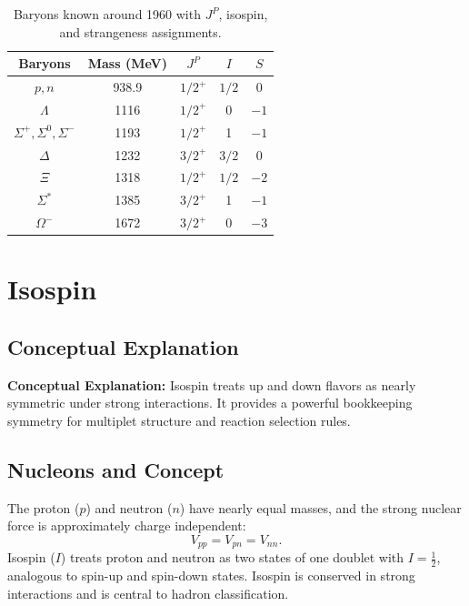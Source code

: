 \documentclass[12pt]{report}
\begin{document}
\begin{table}[H]
    \centering
    \caption{Baryons known around 1960 with $J^P$, isospin, and strangeness assignments.}
    \label{tab:baryons-1960}
    \begin{tabular}{|c|c|c|c|c|}
    \hline
    \textbf{Baryons} & \textbf{Mass (MeV)} & \textbf{$J^P$} & \textbf{$I$} & \textbf{$S$} \\
    \hline
    $p, n$ & 938.9 & $1/2^{+}$ & $1/2$ & 0 \\
    \hline
    $\Lambda$ & 1116 & $1/2^{+}$ & 0 & $-1$ \\
    \hline
    $\Sigma^{+}, \Sigma^{0}, \Sigma^{-}$ & 1193 & $1/2^{+}$ & 1 & $-1$ \\
    \hline
    $\Delta$ & 1232 & $3/2^{+}$ & $3/2$ & 0 \\
    \hline
    $\Xi$ & 1318 & $1/2^{+}$ & $1/2$ & $-2$ \\
    \hline
    $\Sigma^{*}$ & 1385 & $3/2^{+}$ & 1 & $-1$ \\
    \hline
    $\Omega^{-}$ & 1672 & $3/2^{+}$ & 0 & $-3$ \\
    \hline
    \end{tabular}
\end{table}

\section{Isospin}

\subsection{Conceptual Explanation}
\textbf{Conceptual Explanation:} Isospin treats up and down flavors as nearly symmetric under strong interactions. It provides a powerful bookkeeping symmetry for multiplet structure and reaction selection rules.



\subsection{Nucleons and Concept}
The proton ($p$) and neutron ($n$) have nearly equal masses, and the strong nuclear force is approximately charge independent:
\begin{equation}
V_{pp} = V_{pn} = V_{nn}.
\end{equation}
Isospin ($I$) treats proton and neutron as two states of one doublet with $I=\frac{1}{2}$, analogous to spin-up and spin-down states. Isospin is conserved in strong interactions and is central to hadron classification.
\end{document}
